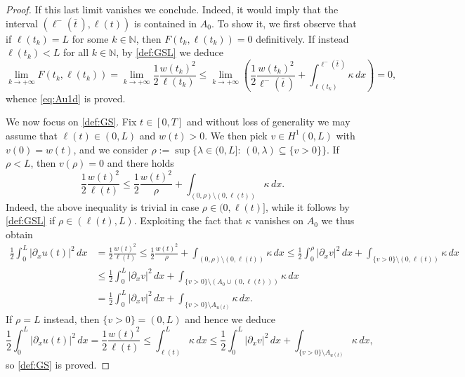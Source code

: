 \documentclass[a4paper,11pt,reqno]{amsart}
\numberwithin{equation}{section}
\theoremstyle{definition}
\theoremstyle{remark}
\newcommand{\n}{\mathbb{N}}
\begin{document}
\begin{proof}
        If this last limit vanishes we conclude.
        Indeed, it would imply that the interval $(\ell^-(\bar t\,), \ell(t))$ is contained in $A_0$. To show it, we first observe that if $\ell(t_k)=L$ for some $k\in \n$, then $F(t_k,\ell(t_k))=0$ definitively. If instead $\ell(t_k)<L$ for all $k\in\n$, by \ref{def:GSL} we deduce
        \begin{equation}
            \lim\limits_{k\to +\infty}F(t_k,\ell(t_k))= \lim\limits_{k\to +\infty}\frac 12 \frac{w(t_k)^2}{\ell(t_k)}\le\lim\limits_{k\to +\infty}\left( \frac 12 \frac{w(t_k)^2}{\ell^-(\bar t\,)}+\int_{\ell(t_k)}^{\ell^-(\bar t\,)}\kappa \, dx\right)=0,
        \end{equation}
        whence \eqref{eq:Au1d} is proved.

        We now focus on \ref{def:GS}. Fix $t\in [0,T]$ and without loss of generality we may assume that $\ell(t)\in (0,L)$ and $w(t)>0$. We then pick $v\in H^1(0,L)$ with $v(0)=w(t)$, and we consider $\rho:=\sup\{\lambda \in (0,L]:\, (0,\lambda)\subseteq \{v>0\}\}$. If $\rho<L$, then $v(\rho)=0$ and there holds
        \begin{equation}
            \frac 12 \frac{w(t)^2}{\ell(t)}\le \frac 12 \frac{w(t)^2}{\rho}+\int_{(0,\rho)\setminus(0,\ell(t))}\kappa\, dx.
        \end{equation}
        Indeed, the above inequality is trivial in case $\rho\in (0,\ell(t)]$, while it follows by \ref{def:GSL} if $\rho\in (\ell(t),L)$. Exploiting the fact that $\kappa$ vanishes on $A_0$ we thus obtain
        \begin{align}
            \frac 12\int_0^L|\partial_x u(t)|^2\,dx&=\frac 12 \frac{w(t)^2}{\ell(t)}\le \frac 12 \frac{w(t)^2}{\rho}+\int_{(0,\rho)\setminus(0,\ell(t))}\kappa\, dx\le \frac 12\int_0^\rho|\partial_x v|^2\,dx+\int_{\{v>0\}\setminus(0,\ell(t))}\kappa\, dx\\
            &\le  \frac 12\int_0^L|\partial_x v|^2\,dx+\int_{\{v>0\}\setminus(A_0\cup (0,\ell(t)))}\kappa\, dx \\
            & = \frac 12\int_0^L|\partial_x v|^2\,dx+\int_{\{v>0\}\setminus A_{u(t)}}\kappa\, dx.
        \end{align}
        If $\rho=L$ instead, then $\{v>0\}=(0,L)$ and hence we deduce
        \begin{equation}
            \frac 12\int_0^L|\partial_x u(t)|^2\,dx=\frac 12 \frac{w(t)^2}{\ell(t)}\le \int_{\ell(t)}^L \kappa\, dx\le \frac 12\int_0^L|\partial_x v|^2\,dx+\int_{\{v>0\}\setminus A_{u(t)}}\kappa\, dx,
        \end{equation}
        so \ref{def:GS} is proved.


\end{proof}
\end{document}
